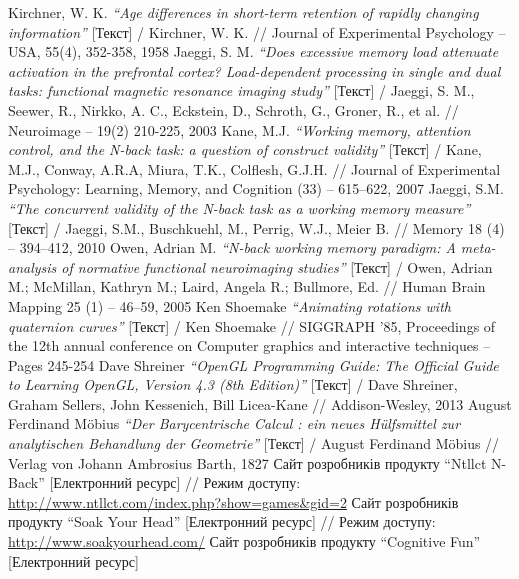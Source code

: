 \begin{thebibliography}{99}
  Kirchner, W. K. \emph{``Age differences in short-term retention of rapidly changing information''} [Текст] / Kirchner, W. K. // Journal of Experimental Psychology -- USA, 55(4), 352-358, 1958
  Jaeggi, S. M. \emph{``Does excessive memory load attenuate activation in the prefrontal cortex? Load-dependent processing in single and dual tasks: functional magnetic resonance imaging study''} [Текст] / Jaeggi, S. M., Seewer, R., Nirkko, A. C., Eckstein, D., Schroth, G., Groner, R., et al. // Neuroimage -- 19(2) 210-225, 2003
  Kane, M.J. \emph{``Working memory, attention control, and the N-back task: a question of construct validity''} [Текст] / Kane, M.J., Conway, A.R.A, Miura, T.K., Colflesh, G.J.H. // Journal of Experimental Psychology: Learning, Memory, and Cognition (33) -- 615–622, 2007
  Jaeggi, S.M. \emph{``The concurrent validity of the N-back task as a working memory measure''} [Текст] / Jaeggi, S.M., Buschkuehl, M., Perrig, W.J., Meier B. // Memory 18 (4) -- 394–412, 2010
  Owen, Adrian M. \emph{``N-back working memory paradigm: A meta-analysis of normative functional neuroimaging studies''} [Текст] / Owen, Adrian M.; McMillan, Kathryn M.; Laird, Angela R.; Bullmore, Ed. // Human Brain Mapping 25 (1) -- 46–59, 2005
  Ken Shoemake \emph{``Animating rotations with quaternion curves''} [Текст] / Ken Shoemake // SIGGRAPH '85, Proceedings of the 12th annual conference on Computer graphics and interactive techniques -- Pages 245-254
  Dave Shreiner \emph{``OpenGL Programming Guide: The Official Guide to Learning OpenGL, Version 4.3 (8th Edition)''} [Текст] / Dave Shreiner, Graham Sellers, John Kessenich, Bill Licea-Kane // Addison-Wesley, 2013
  August Ferdinand M\"obius \emph{``Der Barycentrische Calcul : ein neues H\"ulfsmittel zur analytischen Behandlung der Geometrie''} [Текст] / August Ferdinand M\"obius // Verlag von Johann Ambrosius Barth, 1827
  Сайт розробників продукту ``Ntllct N-Back'' [Електронний ресурс]
  // Режим доступу: \url{http://www.ntllct.com/index.php?show=games\&gid=2}
  Сайт розробників продукту ``Soak Your Head'' [Електронний ресурс]
  // Режим доступу: \url{http://www.soakyourhead.com/}
  Сайт розробників продукту ``Cognitive Fun'' [Електронний ресурс]

\end{thebibliography}

